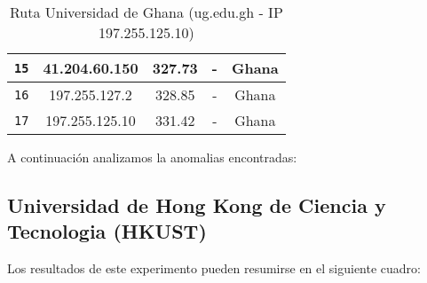 \begin{table}[ht]
\begin{center}
\begin{tabular}{|c|c|c|c|c|}
    \texttt{15} & 41.204.60.150   & 327.73            & -                          & Ghana                          \\ \hline
    \texttt{16} & 197.255.127.2   & 328.85            & -                          & Ghana                          \\ \hline
    \texttt{17} & 197.255.125.10  & 331.42            & -                          & Ghana                          \\ \hline
    \end{tabular}
    \caption{Ruta Universidad de Ghana (ug.edu.gh  - IP 197.255.125.10)}
\end{center}
\end{table}

A continuación analizamos la anomalias encontradas:


\begin{figure}[H]
    \centering
\end{figure}


\subsection{Universidad de Hong Kong de Ciencia y Tecnologia (HKUST)}

Los resultados de este experimento pueden resumirse en el siguiente cuadro:

